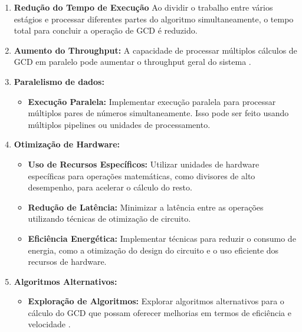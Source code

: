 \documentclass[a4paper,11pt]{article} %
\begin{document}
\begin{enumerate}
    \item \textbf{Redução do Tempo de Execução} Ao dividir o trabalho entre vários estágios e processar diferentes partes do algoritmo simultaneamente, o tempo total para concluir a operação de GCD é reduzido.
    \item \textbf{Aumento do Throughput:} A capacidade de processar múltiplos cálculos de GCD em paralelo pode aumentar o throughput geral do sistema \cite{Harris2010}.
    \item \textbf{Paralelismo de dados:}
          \begin{itemize}
              \item \textbf{Execução Paralela:} Implementar execução paralela para processar múltiplos pares de números simultaneamente. Isso pode ser feito usando múltiplos pipelines ou unidades de processamento.
          \end{itemize}
    \item \textbf{Otimização de Hardware:}
          \begin{itemize}
              \item \textbf{Uso de Recursos Específicos:} Utilizar unidades de hardware específicas para operações matemáticas, como divisores de alto desempenho, para acelerar o cálculo do resto.
              \item \textbf{Redução de Latência:} Minimizar a latência entre as operações utilizando técnicas de otimização de circuito.
              \item \textbf{Eficiência Energética:} Implementar técnicas para reduzir o consumo de energia, como a otimização do design do circuito e o uso eficiente dos recursos de hardware.
          \end{itemize}
    \item \textbf{Algoritmos Alternativos:}
          \begin{itemize}
              \item \textbf{Exploração de Algoritmos:} Explorar algoritmos alternativos para o cálculo do GCD que possam oferecer melhorias em termos de eficiência e velocidade \cite{Skiena2008}.
          \end{itemize}
\end{enumerate}

\end{document}
